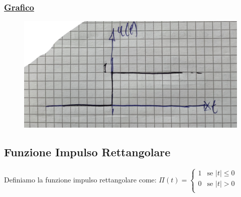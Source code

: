 \documentclass{article}
\begin{document}
\subsubsection{\underline{Grafico}}
\begin{figure}[ht]
\centering
\includegraphics[scale=0.13]{images/9.GradUni.jpeg}
\end{figure}

\subsection{Funzione Impulso Rettangolare}
Definiamo la funzione impulso rettangolare come: $\Pi(t) = \begin{cases} 
1 & \text{se } |t| \leq 0 \\
0 & \text{se } |t| > 0 \\
\end{cases}$
\newpage
\end{document}
